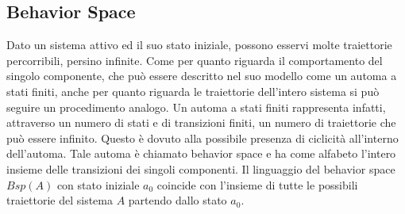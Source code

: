 \subsection{Behavior Space}
Dato un sistema attivo ed il suo stato iniziale, possono esservi molte traiettorie percorribili, persino infinite. Come per quanto riguarda il comportamento del singolo componente, che può essere descritto nel suo modello come un automa a stati finiti, anche per quanto riguarda le traiettorie dell'intero sistema si può seguire un procedimento analogo. Un automa a stati finiti rappresenta infatti, attraverso un numero di stati e di transizioni finiti, un numero di traiettorie che può essere infinito. Questo è dovuto alla possibile presenza di ciclicità all'interno dell'automa. Tale automa è chiamato behavior space e ha come alfabeto l'intero insieme delle transizioni dei singoli componenti.
Il linguaggio del behavior space $Bsp(A)$ con stato iniziale $a_0$ coincide con l'insieme di tutte le possibili traiettorie del sistema $A$ partendo dallo stato $a_0$. 
